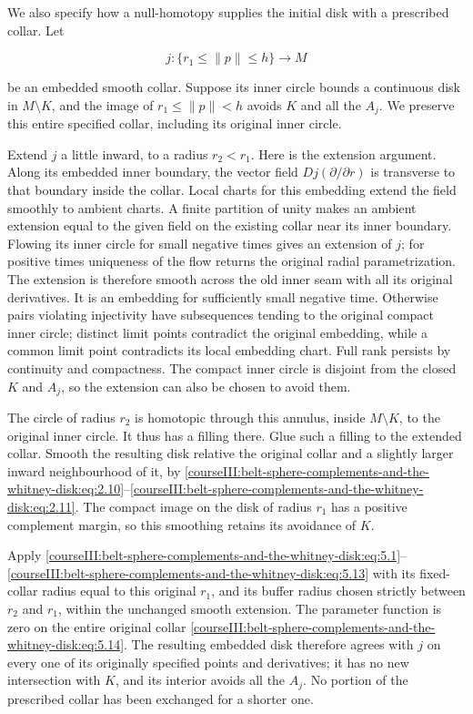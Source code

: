 We also specify how a null-homotopy supplies the initial disk with a prescribed collar. Let

\begin{equation}
j:\{r_1\leq\|p\|\leq h\}\longrightarrow M
\label{courseIII:belt-sphere-complements-and-the-whitney-disk:eq:5.14}
\end{equation}

be an embedded smooth collar. Suppose its inner circle bounds a continuous disk in \(M\setminus K\), and the image of \(r_1\leq\|p\|<h\) avoids \(K\) and all the \(A_j\). We preserve this entire specified collar, including its original inner circle.

Extend \(j\) a little inward, to a radius \(r_2<r_1\). Here is the extension argument. Along its embedded inner boundary, the vector field \(Dj(\partial/\partial r)\) is transverse to that boundary inside the collar. Local charts for this embedding extend the field smoothly to ambient charts. A finite partition of unity makes an ambient extension equal to the given field on the existing collar near its inner boundary. Flowing its inner circle for small negative times gives an extension of \(j\); for positive times uniqueness of the flow returns the original radial parametrization. The extension is therefore smooth across the old inner seam with all its original derivatives. It is an embedding for sufficiently small negative time. Otherwise pairs violating injectivity have subsequences tending to the original compact inner circle; distinct limit points contradict the original embedding, while a common limit point contradicts its local embedding chart. Full rank persists by continuity and compactness. The compact inner circle is disjoint from the closed \(K\) and \(A_j\), so the extension can also be chosen to avoid them.

The circle of radius \(r_2\) is homotopic through this annulus, inside \(M\setminus K\), to the original inner circle. It thus has a filling there. Glue such a filling to the extended collar. Smooth the resulting disk relative the original collar and a slightly larger inward neighbourhood of it, by \eqref{courseIII:belt-sphere-complements-and-the-whitney-disk:eq:2.10}--\eqref{courseIII:belt-sphere-complements-and-the-whitney-disk:eq:2.11}. The compact image on the disk of radius \(r_1\) has a positive complement margin, so this smoothing retains its avoidance of \(K\).

Apply \eqref{courseIII:belt-sphere-complements-and-the-whitney-disk:eq:5.1}--\eqref{courseIII:belt-sphere-complements-and-the-whitney-disk:eq:5.13} with its fixed-collar radius equal to this original \(r_1\), and its buffer radius chosen strictly between \(r_2\) and \(r_1\), within the unchanged smooth extension. The parameter function is zero on the entire original collar \eqref{courseIII:belt-sphere-complements-and-the-whitney-disk:eq:5.14}. The resulting embedded disk therefore agrees with \(j\) on every one of its originally specified points and derivatives; it has no new intersection with \(K\), and its interior avoids all the \(A_j\). No portion of the prescribed collar has been exchanged for a shorter one.

